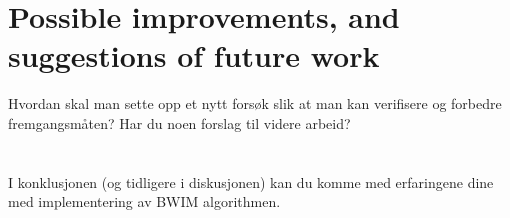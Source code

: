 \section{Possible improvements, and suggestions of future work}
Hvordan skal man sette opp et nytt forsøk slik at  man kan verifisere og forbedre fremgangsmåten?
Har du noen forslag til videre arbeid?
\section{}
I konklusjonen (og tidligere i diskusjonen) kan du komme med erfaringene dine med implementering av BWIM algorithmen.
